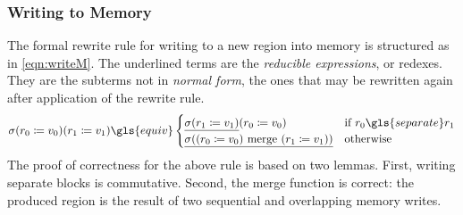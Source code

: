 \subsubsection{Writing to Memory}
The formal rewrite rule for writing to a new region into memory
is structured as in \cref{eqn:writeM}.
The underlined terms are the \emph{reducible expressions},%
or redexes.
They are the subterms not in \emph{normal form},%
the ones that may be rewritten again after application of the rewrite rule.
\begin{equation}
  \sigma(r_0\coloneqq v_0)(r_1\coloneqq v_1)\gls{equiv}\begin{cases}
    \underline{\sigma(r_1\coloneqq v_1)}(r_0\coloneqq v_0) &
      \text{if } r_0\gls{separate}r_1 \\
    \underline{\sigma((r_0\coloneqq v_0)\mmerge(r_1\coloneqq v_1))} &
      \text{otherwise}
  \end{cases}\label{eqn:writeM}
\end{equation}
The proof of correctness for the above rule is based on two lemmas.
First, writing separate blocks is commutative.
Second, the merge function is correct:
the produced region is the result of two sequential and overlapping memory writes.

